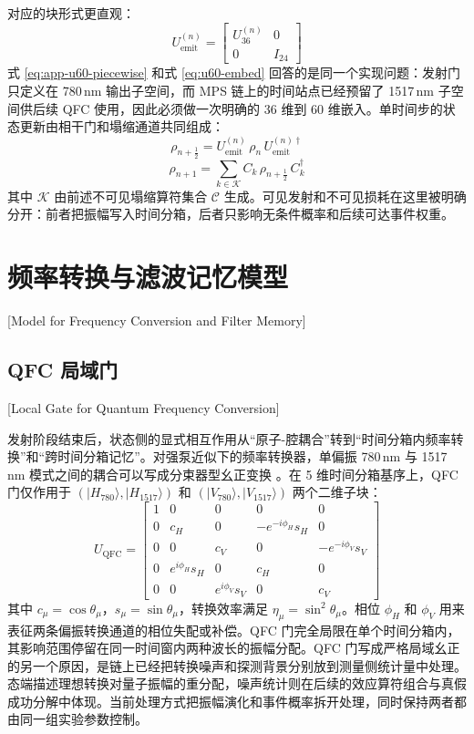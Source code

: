 对应的块形式更直观：
\begin{equation}
U_{\mathrm{emit}}^{(n)}=
\begin{bmatrix}
U_{36}^{(n)} & 0\\
0 & I_{24}
\end{bmatrix}
\label{eq:u60-embed}
\end{equation}
式 \eqref{eq:app-u60-piecewise} 和式 \eqref{eq:u60-embed} 回答的是同一个实现问题：发射门只定义在 780\,nm 输出子空间，而 MPS 链上的时间站点已经预留了 1517\,nm 子空间供后续 QFC 使用，因此必须做一次明确的 36 维到 60 维嵌入。单时间步的状态更新由相干门和塌缩通道共同组成：
\begin{equation}
\rho_{n+\frac12}=U_{\mathrm{emit}}^{(n)}\,\rho_n\,U_{\mathrm{emit}}^{(n)\dagger}
\end{equation}
\begin{equation}
\rho_{n+1}=\sum_{k\in\mathcal{K}} C_k\,\rho_{n+\frac12}\,C_k^\dagger
\label{eq:step-update-emission}
\end{equation}
其中 $\mathcal{K}$ 由前述不可见塌缩算符集合 $\mathcal{C}$ 生成。可见发射和不可见损耗在这里被明确分开：前者把振幅写入时间分箱，后者只影响无条件概率和后续可达事件权重。

\section{频率转换与滤波记忆模型}[Model for Frequency Conversion and Filter Memory]

\subsection{QFC 局域门}[Local Gate for Quantum Frequency Conversion]

发射阶段结束后，状态侧的显式相互作用从“原子-腔耦合”转到“时间分箱内频率转换”和“跨时间分箱记忆”。对强泵近似下的频率转换器，单偏振 780\,nm 与 1517\,nm 模式之间的耦合可以写成分束器型幺正变换 \cite{Ikuta2018PolarizationInsensitiveQFC}。在 5 维时间分箱基序上，QFC 门仅作用于 $(|H_{780}\rangle,|H_{1517}\rangle)$ 和 $(|V_{780}\rangle,|V_{1517}\rangle)$ 两个二维子块：
\begin{equation}
U_{\mathrm{QFC}}=
\begin{bmatrix}
1 & 0 & 0 & 0 & 0\\
0 & c_H & 0 & -e^{-i\phi_H}s_H & 0\\
0 & 0 & c_V & 0 & -e^{-i\phi_V}s_V\\
0 & e^{i\phi_H}s_H & 0 & c_H & 0\\
0 & 0 & e^{i\phi_V}s_V & 0 & c_V
\end{bmatrix}
\label{eq:qfc-gate-5d}
\end{equation}
其中 $c_\mu=\cos\theta_\mu$，$s_\mu=\sin\theta_\mu$，转换效率满足 $\eta_\mu=\sin^2\theta_\mu$。相位 $\phi_H$ 和 $\phi_V$ 用来表征两条偏振转换通道的相位失配或补偿。QFC 门完全局限在单个时间分箱内，其影响范围停留在同一时间窗内两种波长的振幅分配。QFC 门写成严格局域幺正的另一个原因，是链上已经把转换噪声和探测背景分别放到测量侧统计量中处理。态端描述理想转换对量子振幅的重分配，噪声统计则在后续的效应算符组合与真假成功分解中体现。当前处理方式把振幅演化和事件概率拆开处理，同时保持两者都由同一组实验参数控制。

